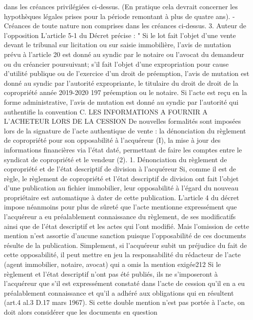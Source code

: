 	dans les créances privilégiées ci-dessus. (En pratique cela devrait concerner les hypothèques
	légales prises pour la période remontant à plus de quatre ans).
	- Créances de toute nature non comprises dans les créances ci-dessus.
	3. Auteur de l’opposition
	L’article 5-1 du Décret précise :
	" Si le lot fait l'objet d'une vente devant le tribunal sur licitation ou sur saisie immobilière, l'avis de mutation
	prévu à l'article 20 est donné au syndic par le notaire ou l'avocat du demandeur ou du créancier
	poursuivant; s'il fait l'objet d'une expropriation pour cause d'utilité publique ou de l'exercice d'un droit de
	préemption, l'avis de mutation est donné au syndic par l'autorité expropriante, le titulaire du droit de
	droit de la copropriété année 2019-2020
	197
	préemption ou le notaire. Si l'acte est reçu en la forme administrative, l'avis de mutation est donné au
	syndic par l'autorité qui authentifie la convention
	C. LES INFORMATIONS A FOURNIR A L’ACHETEUR LORS DE LA CESSION
	De nouvelles formalités sont imposées lors de la signature de l’acte authentique de vente : la dénonciation
	du règlement de copropriété pour son opposabilité à l’acquéreur (I), la mise à jour des informations
	financières via l’état daté, permettant de faire les comptes entre le syndicat de copropriété et le vendeur
	(2).
	1. Dénonciation du règlement de copropriété et de l'état descriptif de division
	à l'acquéreur
	Si, comme il est de règle, le règlement de copropriété et l'état descriptif de division ont fait l'objet d'une
	publication au fichier immobilier, leur opposabilité à l'égard du nouveau propriétaire est automatique à
	dater de cette publication.
	L'article 4 du décret impose néanmoins pour plus de sûreté que l'acte mentionne expressément que
	l'acquéreur a eu préalablement connaissance du règlement, de ses modificatifs ainsi que de l'état
	descriptif et les actes qui l'ont modifié. Mais l'omission de cette mention n'est assortie d'aucune sanction
	puisque l'opposabilité de ces documents résulte de la publication. Simplement, si l'acquéreur subit un
	préjudice du fait de cette opposabilité, il peut mettre en jeu la responsabilité du rédacteur de l'acte (agent
	immobilier, notaire, avocat) qui a omis la mention exigée212
	Si le règlement et l'état descriptif n'ont pas été publiés, ils ne s'imposeront à l'acquéreur que s'il est
	expressément constaté dans l'acte de cession qu'il en a eu préalablement connaissance et qu'il a adhéré
	aux obligations qui en résultent (art.4 al.3 D.17 mars 1967).
	Si cette double mention n'est pas portée à l'acte, on doit alors considérer que les documents en question
